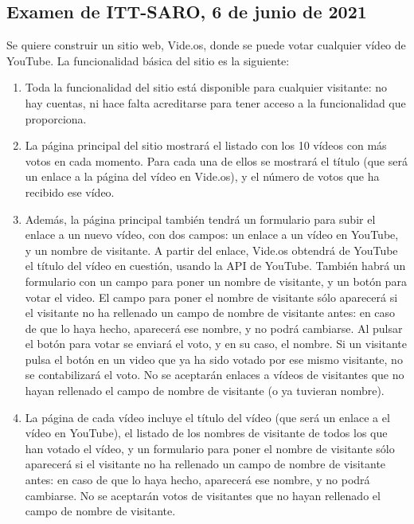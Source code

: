 \subsection{Examen de ITT-SARO, 6 de junio de 2021}

Se quiere construir un sitio web, Vide.os, donde se puede votar cualquier vídeo de YouTube. La funcionalidad básica del sitio es la siguiente:

\begin{enumerate}
\item Toda la funcionalidad del sitio está disponible para cualquier visitante: no hay cuentas, ni hace falta acreditarse para tener acceso a la funcionalidad que proporciona.

\item La página principal del sitio mostrará el listado con los 10 vídeos con más votos en cada momento. Para cada una de ellos se mostrará el título (que será un enlace a la página del vídeo en Vide.os), y el número de votos que ha recibido ese vídeo.

\item Además, la página principal también tendrá un formulario para subir el enlace a un nuevo vídeo, con dos campos: un enlace a un vídeo en YouTube, y un nombre de visitante. A partir del enlace, Vide.os obtendrá de YouTube el título del vídeo en cuestión, usando la API de YouTube. También habrá un formulario con un campo para poner un nombre de visitante, y un botón para votar el video. El campo para poner el nombre de visitante sólo aparecerá si el visitante no ha rellenado un campo de nombre de visitante antes: en caso de que lo haya hecho, aparecerá ese nombre, y no podrá cambiarse. Al pulsar el botón para votar se enviará el voto, y en su caso, el nombre. Si un visitante pulsa el botón en un video que ya ha sido votado por ese mismo visitante, no se contabilizará el voto. No se aceptarán enlaces a vídeos de visitantes que no hayan rellenado el campo de nombre de visitante (o ya tuvieran nombre).

\item La página de cada vídeo incluye el título del vídeo (que será un enlace a el vídeo en YouTube), el listado de los nombres de visitante de todos los que han votado el vídeo, y un formulario para poner el nombre de visitante sólo aparecerá si el visitante no ha rellenado un campo de nombre de visitante antes: en caso de que lo haya hecho, aparecerá ese nombre, y no podrá cambiarse. No se aceptarán votos de visitantes que no hayan rellenado el campo de nombre de visitante.


\end{enumerate}
